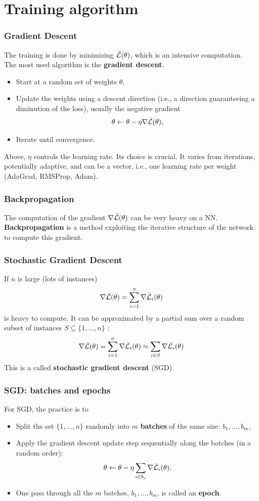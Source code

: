 \section{Training algorithm}
\begin{frame}
\frametitle{Gradient Descent}
The training is done by minimizing $\bar{\cal L}(\theta)$, which is an intensive computation.\\
\vspace{0.3cm}
The most used algorithm is the {\bf gradient descent}.
\begin{itemize}
\item Start at a random set of weights $\theta$,
\item Update the weights using a descent direction (i.e., a direction guaranteeing a diminution of the loss), usually the negative gradient
$$
\theta \leftarrow \theta - \eta \nabla \bar{\cal L}(\theta),
$$
\item Iterate until convergence.
\end{itemize}
Above, $\eta$ controls the learning rate. Its choice is crucial. It varies from iterations, potentially adaptive, and can be a vector, i.e., one learning rate per weight (AdaGrad, RMSProp, Adam).
\end{frame}
\begin{frame}
\frametitle{Backpropagation}
The computation of the gradient $\nabla \bar{\cal L}(\theta)$ can be very heavy on a NN.\\
\vspace{0.3cm}
{\bf Backpropagation} is a method exploiting the iterative structure of the network to compute this gradient.
\end{frame}
\begin{frame}
\frametitle{Stochastic Gradient Descent}
If $n$ is large (lots of instances)
$$
\nabla \bar{\cal L}(\theta)=\sum_{i=1}^n \nabla \bar{\cal L}_i(\theta)
$$
is heavy to compute. It can be approximated by a partial sum over a random subset of instances $S\subseteq \{1,\ldots,n\}$ :
$$
\nabla \bar{\cal L}(\theta)=\sum_{i=1}^n \nabla \bar{\cal L}_i(\theta) \approx \sum_{i \in S} \nabla \bar{\cal L}_i(\theta)
$$
This is a called {\bf stochastic gradient descent} (SGD).
\end{frame}
\begin{frame}
\frametitle{SGD: batches and epochs}
For SGD, the practice is to
\begin{itemize}
\item Split the set $\{1,\ldots,n\}$ randomly into $m$ {\bf batches} of the same size: $b_1,\ldots,b_m$,
\item Apply the gradient descent update step sequentially along the batches (in a random order):
$$
\theta \leftarrow \theta - \eta \sum_{i \in b_j} \nabla \bar{\cal L}_i(\theta).
$$
\item One pass through all the $m$ batches, $b_1,\ldots,b_m$, is called an {\bf epoch}.
\end{itemize}
\end{frame}
